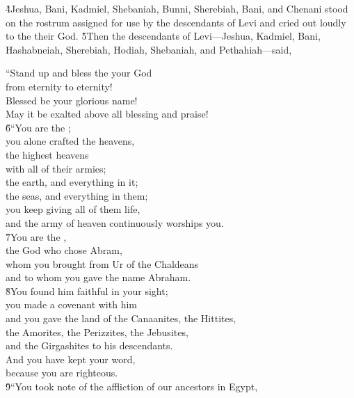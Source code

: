 \v{4}Jeshua, Bani, Kadmiel, Shebaniah, Bunni, Sherebiah, Bani, and Chenani stood on the rostrum assigned for use by the descendants of Levi and cried out loudly to the  their God. \v{5}Then the descendants of Levi---Jeshua, Kadmiel, Bani, Hashabneiah, Sherebiah, Hodiah, Shebaniah, and Pethahiah---said,

\begin{poetry}
\poeml ``Stand up and bless the  your God \\
\poemll    from eternity to eternity! \\
\poeml Blessed be your glorious name! \\
\poemll    May it be exalted above all blessing and praise! \\
\poeml \v{6}``You are the ; \\
\poemll    you alone crafted the heavens, \\
\poeml the highest heavens \\
\poemll    with all of their armies; \\
\poeml the earth, and everything in it; \\
\poemll    the seas, and everything in them; \\
\poeml you keep giving all of them life, \\
\poemll    and the army of heaven continuously worships you. \\
\poeml \v{7}You are the , \\
\poemll    the God who chose Abram, \\
\poeml whom you brought from Ur of the Chaldeans \\
\poemll    and to whom you gave the name Abraham. \\
\poeml \v{8}You found him faithful in your sight; \\
\poemll    you made a covenant with him \\
\poeml and you gave the land of the Canaanites, the Hittites, \\
\poemll    the Amorites, the Perizzites, the Jebusites, \\
\poemlll       and the Girgashites to his descendants. \\
\poeml And you have kept your word, \\
\poemll    because you are righteous. \\
\poeml \v{9}``You took note of the affliction of our ancestors in Egypt, \\

\end{poetry}
